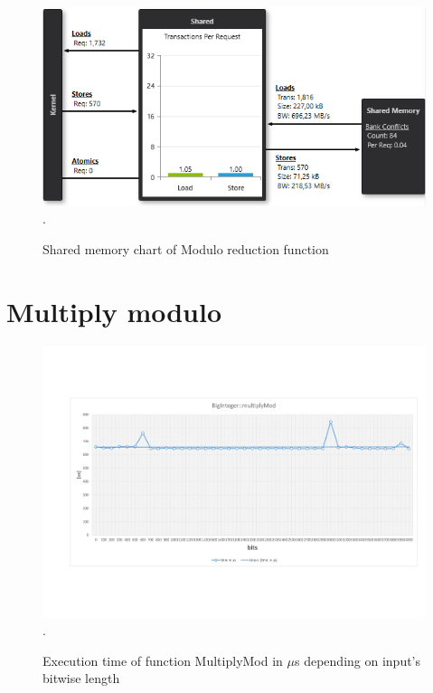 \documentclass[oneside,openright,12pt,final,en]{mgr}
\begin{document}
\begin{figure}[H]
	\centering
	\includegraphics[width=\textwidth]{mod_shared}.
	\caption{Shared memory chart of Modulo reduction function}
	\label{fig:mod_shared}
\end{figure}

\section{Multiply modulo}

\begin{figure}[H]
	\centering
	\includegraphics[width=\textwidth,trim={0.5cm 2.8cm 0.4cm 2.8cm},clip]{mull_mod.pdf}.
	\caption{Execution time of function MultiplyMod in $\mu$s depending on input's bitwise length}
	\label{fig:mull_mod}
\end{figure}
\end{document}
